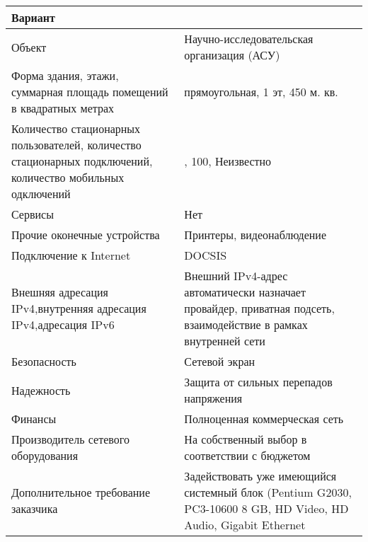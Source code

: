 
\begin{longtable}{
  | >{\raggedright\arraybackslash}m{}
  | >{\raggedright\arraybackslash}m{}|}

  \hline
  Вариант &
  80
  \\
  \hline

  Объект &
  Научно-исследовательская организация (АСУ)
  \\
  \hline

  Форма здания, этажи, суммарная площадь помещений в квадратных метрах &
  прямоугольная, 1 эт, 450 м. кв.
  \\
  \hline

  Количество стационарных пользователей, количество стационарных подключений, количество мобильных одключений &
  50, 100, Неизвестно
  \\
  \hline

  Сервисы &
  Нет
  \\
  \hline

  Прочие оконечные устройства &
  Принтеры, видеонаблюдение
  \\
  \hline

  Подключение к Internet &
  DOCSIS
  \\
  \hline

  Внешняя адресация IPv4,внутренняя адресация IPv4,адресация IPv6 &
  Внешний IPv4-адрес автоматически назначает провайдер, приватная подсеть,  взаимодействие в рамках внутренней сети
  \\
  \hline
  
  Безопасность &
  Сетевой экран
  \\
  \hline

  Надежность &
  Защита от сильных перепадов напряжения
  \\
  \hline

  Финансы &
  Полноценная коммерческая сеть
  \\
  \hline

  Производитель сетевого оборудования &
  На собственный выбор в соответствии с бюджетом
  \\
  \hline

  Дополнительное требование заказчика &
  Задействовать уже имеющийся системный блок (Pentium G2030, PC3-10600 8 GB, HD Video, HD Audio, Gigabit Ethernet
  \\
  \hline
\end{longtable}  

\newpage